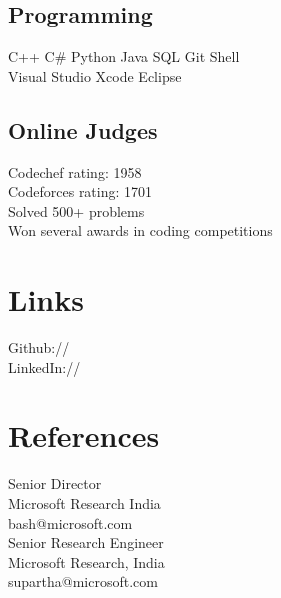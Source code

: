 \documentclass[]{resume-openfont}
\begin{document}
\begin{minipage}[t]{0.25\textwidth}
\subsection{Programming}
C++ \textbullet{}   C\# \textbullet{} Python \textbullet{} Java \textbullet{} SQL \textbullet{} Git \textbullet{} Shell\\
Visual Studio \textbullet{} Xcode\textbullet{} Eclipse \\

\sectionsep

\subsection{Online Judges}
Codechef rating: 1958 \\
Codeforces rating: 1701 \\
\textbullet{} Solved 500+ problems \\
\textbullet{} Won several awards in coding competitions
\sectionsep


\section{Links} 
Github:// \href{https://github.com/pranavr93}{} \\
LinkedIn://  \href{https://www.linkedin.com/in/pranavramarao}{} \\
\sectionsep


\section{References}
Senior Director \\
Microsoft Research India \\
bash@microsoft.com \\

\sectionsep
{}
Senior Research Engineer \\
Microsoft Research, India \\
supartha@microsoft.com

%
%

\end{minipage} 
\end{document}
